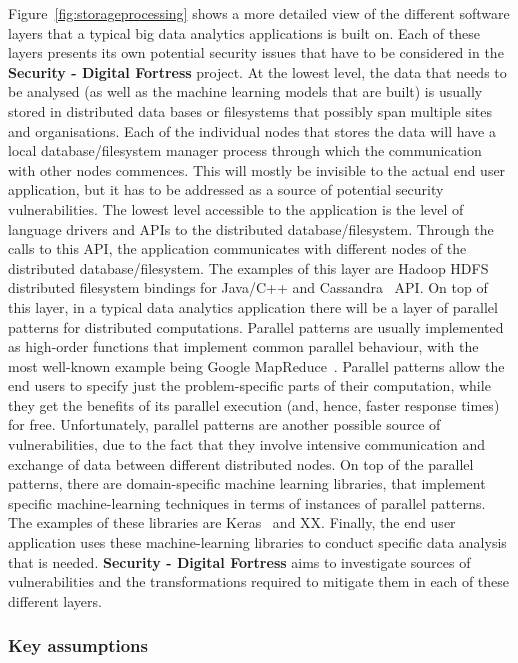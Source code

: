 \documentclass[a4paper,11pt]{article}
\newcommand{\project}[1]{\textbf{#1}\xspace}
\newcommand{\SECURITY}{\project{Security - Digital Fortress}}
\newcommand{\TheProject}{\SECURITY}
\begin{document}
Figure~\ref{fig:storageprocessing} shows a more detailed view of the different software layers that a typical big data analytics applications is built on. Each of these layers presents its own potential security issues that have to be considered in the \TheProject{} project. At the lowest level, the data that needs to be analysed (as well as the machine learning models that are built) is usually stored in distributed data bases or filesystems that possibly span multiple sites and organisations. Each of the individual nodes that stores the data will have a local database/filesystem manager process through which the communication with other nodes commences. This will mostly be invisible to the actual end user application, but it has to be addressed as a source of potential security vulnerabilities. The lowest level accessible to the application is the level of language drivers and APIs to the distributed database/filesystem. Through the calls to this API, the application communicates with different nodes of the distributed database/filesystem. The examples of this layer are Hadoop HDFS~\cite{hdfs} distributed filesystem bindings for Java/C++ and Cassandra~\cite{cassandra} API. On top of this layer, in a typical data analytics application there will be a layer of parallel patterns for distributed computations. Parallel patterns are usually implemented as high-order functions that implement common parallel behaviour, with the most well-known example being Google MapReduce~\cite{mapreduce}. Parallel patterns allow the end users to specify just the problem-specific parts of their computation, while they get the benefits of its parallel execution (and, hence, faster response times) for free. Unfortunately, parallel patterns are another possible source of vulnerabilities, due to the fact that they involve intensive communication and exchange of data between different distributed nodes. On top of the parallel patterns, there are domain-specific machine learning libraries, that implement specific machine-learning techniques in terms of instances of parallel patterns. The examples of these libraries are Keras~\cite{keras} and XX. Finally, the end user application uses these machine-learning libraries to conduct specific data analysis that is needed. \TheProject{} aims to investigate sources of vulnerabilities and the transformations required to mitigate them in each of these different layers.

\subsubsection*{Key assumptions}
\end{document}
